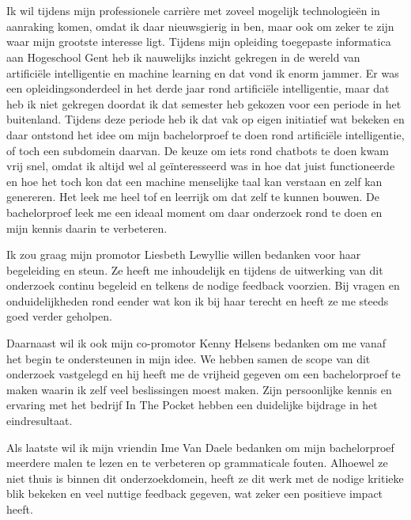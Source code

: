 
\chapter*{}
\label{ch:voorwoord}


Ik wil tijdens mijn professionele carrière met zoveel mogelijk technologieën in aanraking komen, omdat ik daar nieuwsgierig in ben, maar ook om zeker te zijn waar mijn grootste interesse ligt. Tijdens mijn opleiding toegepaste informatica aan Hogeschool Gent heb ik nauwelijks inzicht gekregen in de wereld van artificiële intelligentie en machine learning en dat vond ik enorm jammer. Er was een opleidingsonderdeel in het derde jaar rond artificiële intelligentie, maar dat heb ik niet gekregen doordat ik dat semester heb gekozen voor een periode in het buitenland. Tijdens deze periode heb ik dat vak op eigen initiatief wat bekeken en daar ontstond het idee om mijn bachelorproef te doen rond artificiële intelligentie, of toch een subdomein daarvan. De keuze om iets rond chatbots te doen kwam vrij snel, omdat ik altijd wel al geïnteresseerd was in hoe dat juist functioneerde en hoe het toch kon dat een machine menselijke taal kan verstaan en zelf kan genereren. Het leek me heel tof en leerrijk om dat zelf te kunnen bouwen. De bachelorproef leek me een ideaal moment om daar onderzoek rond te doen en mijn kennis daarin te verbeteren.

Ik zou graag mijn promotor Liesbeth Lewyllie willen bedanken voor haar begeleiding en steun. Ze heeft me inhoudelijk en tijdens de uitwerking van dit onderzoek continu begeleid en telkens de nodige feedback voorzien. Bij vragen en onduidelijkheden rond eender wat kon ik bij haar terecht en heeft ze me steeds goed verder geholpen.

Daarnaast wil ik ook mijn co-promotor Kenny Helsens bedanken om me vanaf het begin te ondersteunen in mijn idee. We hebben samen de scope van dit onderzoek vastgelegd en hij heeft me de vrijheid gegeven om een bachelorproef te maken waarin ik zelf veel beslissingen moest maken. Zijn persoonlijke kennis en ervaring met het bedrijf In The Pocket hebben een duidelijke bijdrage in het eindresultaat.

Als laatste wil ik mijn vriendin Ime Van Daele bedanken om mijn bachelorproef meerdere malen te lezen en te verbeteren op grammaticale fouten. Alhoewel ze niet thuis is binnen dit onderzoekdomein, heeft ze dit werk met de nodige kritieke blik bekeken en veel nuttige feedback gegeven, wat zeker een positieve impact heeft.
